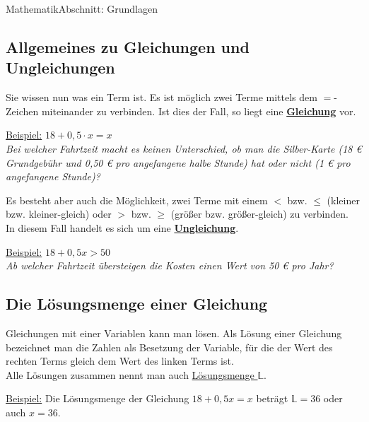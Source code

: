\documentclass[11pt,twocolumn,oneside,openany,headings=optiontotoc,11pt,numbers=noenddot]{article}
\begin{document}
\begin{worksheet}{}{Mathematik}{Abschnitt: Grundlagen}
		\subsection{Allgemeines zu Gleichungen und Ungleichungen}
		Sie wissen nun was ein Term ist. Es ist möglich zwei Terme mittels dem \glqq{}\(=\)\grqq{}-Zeichen miteinander zu verbinden. Ist dies der Fall, so liegt eine \underline{\textbf{Gleichung}} vor.\\
		\par\bigskip\noindent
		\underline{Beispiel:} \(18 + 0,5\cdot{}x = x\)\\
		\glqq{}\textit{Bei welcher Fahrtzeit macht es keinen Unterschied, ob man die Silber-Karte (18 \euro{} Grundgebühr und 0,50 \euro{} pro angefangene halbe Stunde) hat oder nicht (1 \euro{} pro angefangene Stunde)?}\grqq{}\\
		\par\bigskip\noindent
		Es besteht aber auch die Möglichkeit, zwei Terme mit einem \glqq{}\(<\)\grqq{} bzw. \glqq{}\(\leq\)\grqq{} (\glqq{}kleiner\grqq{} bzw. \glqq{}kleiner-gleich\grqq{}) oder \glqq{}\(>\)\grqq{} bzw. \glqq{}\(\geq\)\grqq{} (\glqq{}größer\grqq{} bzw. \glqq{}größer-gleich\grqq{}) zu verbinden.\\
		In diesem Fall handelt es sich um eine \underline{\textbf{Ungleichung}}.\\
		\par\bigskip\noindent
		\underline{Beispiel:} \(18 + 0,5x > 50\)\\
		\glqq{}\textit{Ab welcher Fahrtzeit übersteigen die Kosten einen Wert von 50 \euro{} pro Jahr?}\grqq{}\\
		\subsection{Die Lösungsmenge einer Gleichung}
		Gleichungen mit einer Variablen kann man lösen. Als Lösung einer Gleichung bezeichnet man die Zahlen als Besetzung der Variable, für die der Wert des rechten Terms gleich dem Wert des linken Terms ist.\\
		Alle Lösungen zusammen nennt man auch \underline{Lösungsmenge \(\mathbb{L}\)}.\\
		\par\bigskip\noindent
		\underline{Beispiel:} Die Lösungsmenge der Gleichung \(18 + 0,5x = x\) beträgt \(\mathbb{L} = {36}\) oder auch \(x=36\).

\end{worksheet}
\end{document}
